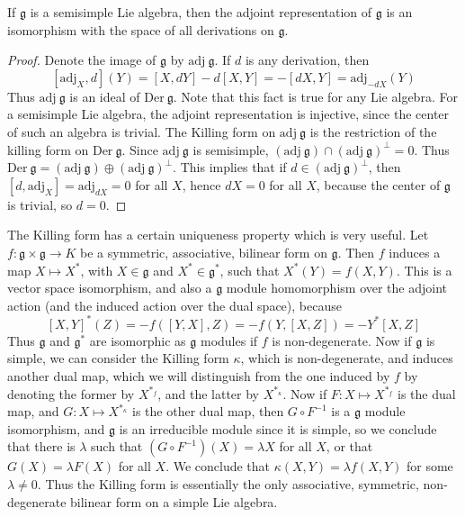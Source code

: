 \begin{theorem}
    If $\mathfrak{g}$ is a semisimple Lie algebra, then the adjoint representation of $\mathfrak{g}$ is an isomorphism with the space of all derivations on $\mathfrak{g}$.
\end{theorem}
\begin{proof}
    Denote the image of $\mathfrak{g}$ by $\text{adj}\ \mathfrak{g}$. If $d$ is any derivation, then
    \[ [\text{adj}_X, d](Y) = [X,dY] - d[X,Y] = -[dX,Y] = \text{adj}_{-dX}(Y) \]
    Thus $\text{adj}\ \mathfrak{g}$ is an ideal of $\text{Der}\ \mathfrak{g}$. Note that this fact is true for any Lie algebra. For a semisimple Lie algebra, the adjoint representation is injective, since the center of such an algebra is trivial. The Killing form on $\text{adj}\ \mathfrak{g}$ is the restriction of the killing form on $\text{Der}\ \mathfrak{g}$. Since $\text{adj}\ \mathfrak{g}$ is semisimple, $(\text{adj}\ \mathfrak{g}) \cap (\text{adj}\ \mathfrak{g})^\perp = 0$. Thus $\text{Der}\ \mathfrak{g} = (\text{adj}\ \mathfrak{g}) \oplus (\text{adj}\ \mathfrak{g})^\perp$. This implies that if $d \in (\text{adj}\ \mathfrak{g})^\perp$, then $[d,\text{adj}_X] = \text{adj}_{dX} = 0$ for all $X$, hence $dX = 0$ for all $X$, because the center of $\mathfrak{g}$ is trivial, so $d = 0$.
\end{proof}

The Killing form has a certain uniqueness property which is very useful. Let $f: \mathfrak{g} \times \mathfrak{g} \to K$ be a symmetric, associative, bilinear form on $\mathfrak{g}$. Then $f$ induces a map $X \mapsto X^*$, with $X \in \mathfrak{g}$ and $X^* \in \mathfrak{g}^*$, such that $X^*(Y) = f(X,Y)$. This is a vector space isomorphism, and also a $\mathfrak{g}$ module homomorphism over the adjoint action (and the induced action over the dual space), because
%
\[ [X,Y]^*(Z) = -f([Y,X],Z) = -f(Y,[X,Z]) = -Y^*[X,Z] \]
%
Thus $\mathfrak{g}$ and $\mathfrak{g}^*$ are isomorphic as $\mathfrak{g}$ modules if $f$ is non-degenerate. Now if $\mathfrak{g}$ is simple, we can consider the Killing form $\kappa$, which is non-degenerate, and induces another dual map, which we will distinguish from the one induced by $f$ by denoting the former by $X^{*_f}$, and the latter by $X^{*_\kappa}$. Now if $F: X \mapsto X^{*_f}$ is the dual map, and $G: X \mapsto X^{*_\kappa}$ is the other dual map, then $G \circ F^{-1}$ is a $\mathfrak{g}$ module isomorphism, and $\mathfrak{g}$ is an irreducible module since it is simple, so we conclude that there is $\lambda$ such that $(G \circ F^{-1})(X) = \lambda X$ for all $X$, or that $G(X) = \lambda F(X)$ for all $X$. We conclude that $\kappa(X,Y) = \lambda f(X,Y)$ for some $\lambda \neq 0$. Thus the Killing form is essentially the only associative, symmetric, non-degenerate bilinear form on a simple Lie algebra.

